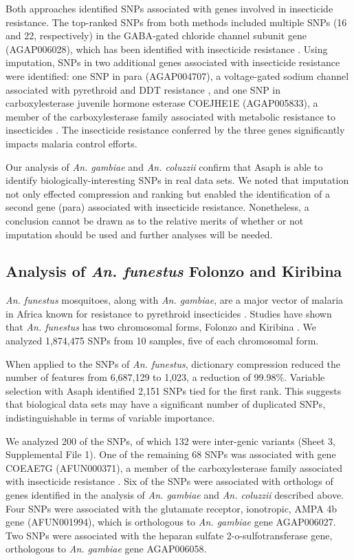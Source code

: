 Both approaches identified SNPs associated with genes involved in insecticide resistance.  The top-ranked SNPs from both methods included multiple SNPs (16 and 22, respectively) in the GABA-gated chloride channel subunit gene (AGAP006028), which has been identified with insecticide resistance \cite{Du2005,Buckingham2005,Lawniczak2010}. Using imputation, SNPs in two additional genes associated with insecticide resistance were identified: one SNP in para (AGAP004707), a voltage-gated sodium channel associated with pyrethroid and DDT resistance \cite{Martinez-Torres1998,Ranson2000,Brengues2003}, and one SNP in carboxylesterase juvenile hormone esterase COEJHE1E (AGAP005833), a member of the carboxylesterase family associated with metabolic resistance to insecticides \cite{Ranson2002}. The insecticide resistance conferred by the three genes significantly impacts malaria control efforts.

Our analysis of \emph{An. gambiae} and \emph{An. coluzzii} confirm that Asaph is able to identify biologically-interesting SNPs in real data sets.  We noted that imputation not only effected compression and ranking but enabled the identification of a second gene (para) associated with insecticide resistance.  Nonetheless, a conclusion cannot be drawn as to the relative merits of whether or not imputation should be used and further analyses will be needed.

\subsection{Analysis of \emph{An. funestus} Folonzo and Kiribina}
\emph{An. funestus} mosquitoes, along with \emph{An. gambiae}, are a major vector of malaria in Africa \cite{Coetzee2004} known for resistance to pyrethroid insecticides \cite{Hargreaves2000}. Studies have shown that \emph{An. funestus} has two chromosomal forms, Folonzo and Kiribina \cite{Michel2005,Cohuet2005,Michel2006,Wondji2007}.  We analyzed 1,874,475 SNPs from 10 samples, five of each chromosomal form.

When applied to the SNPs of \emph{An. funestus}, dictionary compression reduced the number of features from 6,687,129 to 1,023, a reduction of 99.98\%.  Variable selection with Asaph identified 2,151 SNPs tied for the first rank.  This suggests that biological data sets may have a significant number of duplicated SNPs, indistinguishable in terms of variable importance.  

We analyzed 200 of the SNPs, of which 132 were inter-genic variants (Sheet 3, Supplemental File 1).  One of the remaining 68 SNPs was associated with gene COEAE7G (AFUN000371), a member of the carboxylesterase family associated with insecticide resistance \cite{Ranson2002}.  Six of the SNPs were associated with orthologs of genes identified in the analysis of \emph{An. gambiae} and \emph{An. coluzzii} described above.  Four SNPs were associated with the glutamate receptor, ionotropic, AMPA 4b gene (AFUN001994), which is orthologous to \emph{An. gambiae} gene AGAP006027. Two SNPs were associated with the heparan sulfate 2-o-sulfotransferase gene, orthologous to \emph{An. gambiae} gene AGAP006058.

